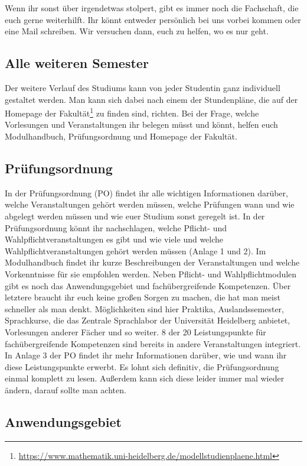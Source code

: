 Wenn ihr sonst über irgendetwas stolpert, gibt es immer noch die Fachschaft, die euch gerne weiterhilft. Ihr könnt entweder persönlich bei uns vorbei kommen oder eine Mail schreiben. Wir versuchen dann, euch zu helfen, wo es nur geht.

\subsection{Alle weiteren Semester}

Der weitere Verlauf des Studiums kann von jeder Studentin ganz individuell gestaltet werden. Man kann sich dabei nach einem der Stundenpläne, die auf der Homepage der Fakultät\footnote{\url{https://www.mathematik.uni-heidelberg.de/modellstudienplaene.html}} zu finden sind, richten. Bei der Frage, welche Vorlesungen und Veranstaltungen ihr belegen müsst und könnt, helfen euch Modulhandbuch, Prüfungsordnung und Homepage der Fakultät.

\subsection{Prüfungsordnung}

In der Prüfungsordnung (PO) findet ihr alle wichtigen Informationen darüber, welche Veranstaltungen gehört werden müssen, welche Prüfungen wann und wie abgelegt werden müssen und wie euer Studium sonst geregelt ist. In der Prüfungsordnung könnt ihr nachschlagen, welche Pflicht- und Wahlpflichtveranstaltungen es gibt und wie viele und welche Wahlpflichtveranstaltungen gehört werden müssen (Anlage 1 und 2).  Im Modulhandbuch findet ihr kurze Beschreibungen der Veranstaltungen und welche Vorkenntnisse für sie empfohlen werden. Neben Pflicht- und Wahlpflichtmodulen gibt es noch das Anwendungsgebiet und fachübergreifende Kompetenzen. Über letztere braucht ihr euch keine großen Sorgen zu machen, die hat man meist schneller als man denkt. Möglichkeiten sind hier Praktika, Auslandssemester, Sprachkurse, die das Zentrale Sprachlabor der Universität Heidelberg anbietet, Vorlesungen anderer Fächer und so weiter. 8 der 20 Leistungspunkte für fachübergreifende Kompetenzen sind bereits in andere Veranstaltungen integriert. In Anlage 3 der PO findet ihr mehr Informationen darüber, wie und wann ihr diese Leistungspunkte erwerbt. Es lohnt sich definitiv, die Prüfungsordnung einmal komplett zu lesen. Außerdem kann sich diese leider immer mal wieder ändern, darauf sollte man achten.

\subsection{Anwendungsgebiet}

